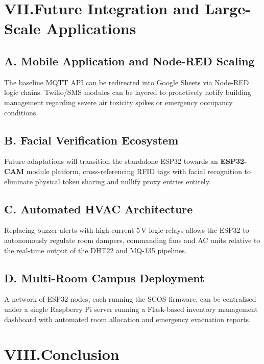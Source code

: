 \documentclass[12pt,a4paper]{article}
\begin{document}
\section*{VII.\quad Future Integration and Large-Scale Applications}

\subsection*{A. Mobile Application and Node-RED Scaling}
The baseline MQTT API can be redirected into Google Sheets via Node-RED logic chains.
Twilio/SMS modules can be layered to proactively notify building management regarding
severe air toxicity spikes or emergency occupancy conditions.

\subsection*{B. Facial Verification Ecosystem}
Future adaptations will transition the standalone ESP32 towards an \textbf{ESP32-CAM}
module platform, cross-referencing RFID tags with facial recognition to eliminate
physical token sharing and nullify proxy entries entirely.

\subsection*{C. Automated HVAC Architecture}
Replacing buzzer alerts with high-current 5\,V logic relays allows the ESP32 to
autonomously regulate room dampers, commanding fans and AC units relative to the
real-time output of the DHT22 and MQ-135 pipelines.

\subsection*{D. Multi-Room Campus Deployment}
A network of ESP32 nodes, each running the SCOS firmware, can be centralised under a
single Raspberry Pi server running a Flask-based inventory management dashboard with
automated room allocation and emergency evacuation reports.

\section*{VIII.\quad Conclusion}
\end{document}
